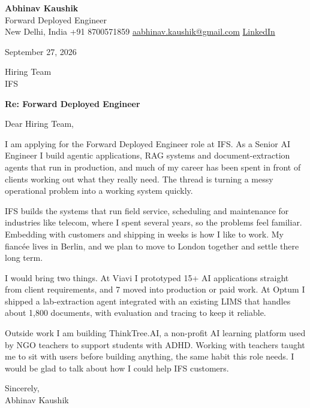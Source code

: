 \documentclass[11pt,a4paper]{article}
\begin{document}
{\Large\bfseries Abhinav Kaushik}\\
Forward Deployed Engineer\\
New Delhi, India \textbar{} +91 8700571859 \textbar{} \href{mailto:aabhinav.kaushik@gmail.com}{aabhinav.kaushik@gmail.com} \textbar{} \href{https://www.linkedin.com/in/abhinav-kaushik10/}{LinkedIn}  

September 27, 2026

Hiring Team\\
IFS

\textbf{Re: Forward Deployed Engineer}

Dear Hiring Team,

I am applying for the Forward Deployed Engineer role at IFS. As a Senior AI Engineer I build agentic applications, RAG systems and document-extraction agents that run in production, and much of my career has been spent in front of clients working out what they really need. The thread is turning a messy operational problem into a working system quickly.

IFS builds the systems that run field service, scheduling and maintenance for industries like telecom, where I spent several years, so the problems feel familiar. Embedding with customers and shipping in weeks is how I like to work. My fiancée lives in Berlin, and we plan to move to London together and settle there long term.

I would bring two things. At Viavi I prototyped 15+ AI applications straight from client requirements, and 7 moved into production or paid work. At Optum I shipped a lab-extraction agent integrated with an existing LIMS that handles about 1,800 documents, with evaluation and tracing to keep it reliable.

Outside work I am building ThinkTree.AI, a non-profit AI learning platform used by NGO teachers to support students with ADHD. Working with teachers taught me to sit with users before building anything, the same habit this role needs. I would be glad to talk about how I could help IFS customers.

Sincerely,\\[4pt]
Abhinav Kaushik
\end{document}
